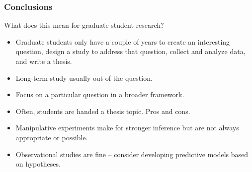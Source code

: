 \documentclass[color=usenames,dvipsnames]{beamer}\usepackage[]{graphicx}\usepackage[]{color}
\begin{document}
\begin{frame}
  \frametitle{Conclusions}
  What does this mean for graduate student research?
  \begin{itemize}
    \item Graduate students only have a couple of years to create an
      interesting question, design a study to address that question,
      collect and analyze data, and write a thesis.
    \item Long-term study usually out of the question.
    \item Focus on a particular question in a
      broader framework.
    \item Often, students are handed a thesis topic. Pros and cons.
    \item Manipulative experiments make for stronger
      inference but are not always appropriate or possible.
    \item Observational studies are fine -- consider
      developing predictive models based on hypotheses.
  \end{itemize}
\end{frame}
\end{document}
